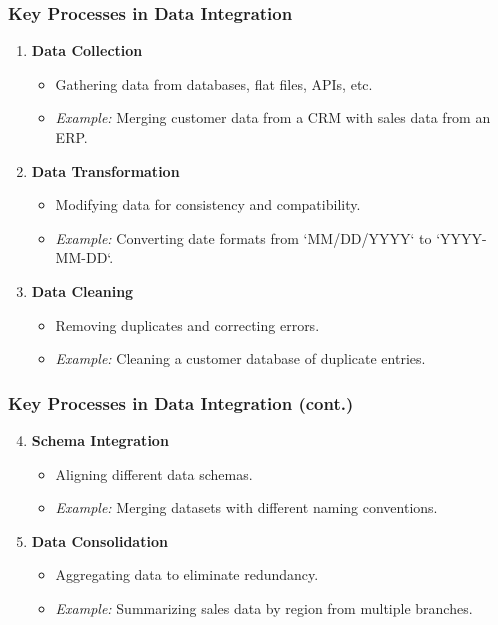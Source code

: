 \documentclass[aspectratio=169]{beamer}
\begin{document}
\begin{frame}[fragile]
    \frametitle{Key Processes in Data Integration}
    \begin{enumerate}
        \item \textbf{Data Collection}
        \begin{itemize}
            \item Gathering data from databases, flat files, APIs, etc.
            \item \textit{Example:} Merging customer data from a CRM with sales data from an ERP.
        \end{itemize}
        
        \item \textbf{Data Transformation}
        \begin{itemize}
            \item Modifying data for consistency and compatibility.
            \item \textit{Example:} Converting date formats from `MM/DD/YYYY` to `YYYY-MM-DD`.
        \end{itemize}

        \item \textbf{Data Cleaning}
        \begin{itemize}
            \item Removing duplicates and correcting errors.
            \item \textit{Example:} Cleaning a customer database of duplicate entries.
        \end{itemize}
    \end{enumerate}
\end{frame}

\begin{frame}[fragile]
    \frametitle{Key Processes in Data Integration (cont.)}
    \begin{enumerate}
        \setcounter{enumi}{3}
        \item \textbf{Schema Integration}
        \begin{itemize}
            \item Aligning different data schemas.
            \item \textit{Example:} Merging datasets with different naming conventions.
        \end{itemize}

        \item \textbf{Data Consolidation}
        \begin{itemize}
            \item Aggregating data to eliminate redundancy.
            \item \textit{Example:} Summarizing sales data by region from multiple branches.
        \end{itemize}
    \end{enumerate}
\end{frame}
\end{document}
